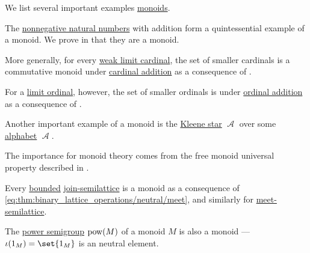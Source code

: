 \begin{example}\label{ex:def:monoid}
  We list several important examples \hyperref[def:monoid]{monoids}.

  \begin{thmenum}
     The \hyperref[def:natural_numbers]{nonnegative natural numbers} with addition form a quintessential example of a monoid. We prove in  that they are a monoid.

     More generally, for every \hyperref[def:successor_and_limit_cardinal/weak_limit]{weak limit cardinal}, the set of smaller cardinals is a commutative monoid under \hyperref[def:cardinal_arithmetic/addition]{cardinal addition} as a consequence of .

     For a \hyperref[def:successor_and_limit_ordinal]{limit ordinal}, however, the set of smaller ordinals is  under \hyperref[def:ordinal_arithmetic/addition]{ordinal addition} as a consequence of .

     Another important example of a monoid is the \hyperref[def:formal_language/kleene_star]{Kleene star} \( \mscrA \) over some \hyperref[def:formal_language]{alphabet} \( \mscrA \).

    The importance for monoid theory comes from the free monoid universal property described in .

     Every \hyperref[def:semilattice/bounded]{bounded} \hyperref[def:semilattice/join]{join-semilattice} is a monoid as a consequence of \eqref{eq:thm:binary_lattice_operations/neutral/meet}, and similarly for \hyperref[def:semilattice/meet]{meet-semilattice}.

     The \hyperref[def:power_semigroup]{power semigroup} \( \operatorname{pow}(M) \) of a monoid \( M \) is also a monoid --- \( \iota(1_M) = \set{ 1_M } \) is an neutral element.
  \end{thmenum}
\end{example}

